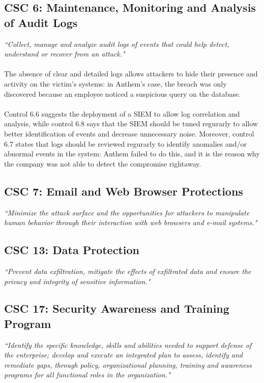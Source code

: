 	\subsection{CSC 6: Maintenance, Monitoring and Analysis of Audit Logs}
	\textit{``Collect, manage and analyze audit logs of events that could help detect, understand or recover from an attack."}\\\\
	The absence of clear and detailed logs allows attackers to hide their presence and activity on the victim's systems: in Anthem's case, the breach was only discovered because an employee noticed a suspicious query on the database.\\\\ Control 6.6 suggests the deployment of a SIEM to allow log correlation and analysis, while control 6.8 says that the SIEM should be tuned regurarly to allow better identification of events and decrease unnecessary noise. Moreover, control 6.7 states that logs should be reviewed regurarly to identify anomalies and/or abnormal events in the system: Anthem failed to do this, and it is the reason why the company was not able to detect the compromise rightaway.
	
	\subsection{CSC 7: Email and Web Browser Protections}
	\textit{``Minimize the attack surface and the opportunities for attackers to manipulate human behavior through their interaction with web browsers and e-mail systems."}
	\subsection{CSC 13: Data Protection}
	\textit{``Prevent data exfiltration, mitigate the effects of exfiltrated data and ensure the privacy and integrity of sensitive information."}
	\subsection{CSC 17: Security Awareness and Training Program}
	\textit{``Identify the specific knowledge, skills and abilities needed to support defense of the enterprise; develop and execute an integrated plan to assess, identify and remediate gaps, through policy, organizational planning, training and awareness programs for all functional roles in the organization."}


